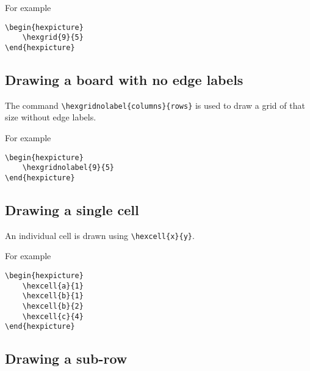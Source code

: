 \documentclass[a4paper,12pt]{article}
\begin{document}
    For example
    
    \begin{verbatim}\begin{hexpicture}
    \hexgrid{9}{5}
\end{hexpicture}\end{verbatim}
    
    \begin{hexpicture}
    \end{hexpicture}
    
    \subsection{Drawing a board with no edge labels}
    
    The command \verb|\hexgridnolabel{columns}{rows}| is used to draw a grid of that size without edge labels.
    
    For example
    
    \begin{verbatim}\begin{hexpicture}
    \hexgridnolabel{9}{5}
\end{hexpicture}\end{verbatim}
    
    \begin{hexpicture}
    \end{hexpicture}
    
    
    \subsection{Drawing a single cell}
    
    An individual cell is drawn using \verb|\hexcell{x}{y}|. 
    
    For example
    
    \begin{verbatim}\begin{hexpicture}
    \hexcell{a}{1}
    \hexcell{b}{1}
    \hexcell{b}{2}
    \hexcell{c}{4}
\end{hexpicture}\end{verbatim}
    
    \begin{hexpicture}
    \end{hexpicture}
    
    \subsection{Drawing a sub-row}
    
\end{document}
